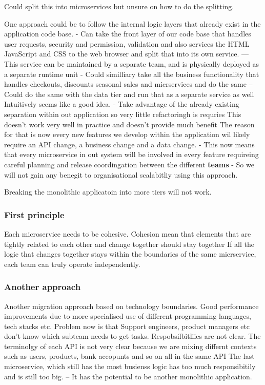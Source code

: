 \documentclass[a4paper, 11pt]{book}
\begin{document}
    Could split this into microservices but unsure on how to do the splitting.

    One approach could be to follow the internal logic layers that already exist in the application code base.
    - Can take the front layer of our code base that handles user requests, security and permission, validation and also services the HTML JavaScript and CSS to the web browser and split that into its own service.
    --- This service can be maintained by a separate team, and is physically deployed as a separate runtime unit
    - Could similliary take all the business functionality that handles checkouts, discounts seasonal sales and micrservices and do the same
    -- Could do the same with the data tier and run that as a separate service as well
    Intuitively seems like a good idea.
    - Take advantage of the already existing separation within out application so very little refactoringh is requries
    This doesn't work very well in practice and doesn't provide much benefit
    The reason for that is now every new features we develop within the application wil likely require an API change, a business change and a data change.
    - This now means that every microservice in out system will be involved in every feature requireing careful planning and release coordingation between the different \textbf{teams}
    - So we will not gain any benegit to organisational scalabitliy using this approach.

    Breaking the monolithic applicatoin into more tiers will not work.

    \subsubsection{First principle}
    Each microservice needs to be cohesive.
    Cohesion mean that elements that are tightly related to each other and change together should stay together
    If all the logic that changes together stays within the boundaries of the same micrservice, each team can truly operate independently.

    \subsubsection{Another approach}
    Another migration approach based on technology boundaries.
    Good performance improvements due to more specialised use of different programming languages, tech stacks etc.
    Problem now is that Support engineers, product managers etc don't know which subteam needs to get tasks.
    Respobsilbitliies are not clear.
    The terminolgy of each API is not very clear because we are mixing differnt contexts such as users, products, bank accopunts and so on all in the same API
    The last microservice, which still has the most busienss logic has too much responsibitily and is still too big.
    -- It has the potential to be another monolithic application.
\end{document}
